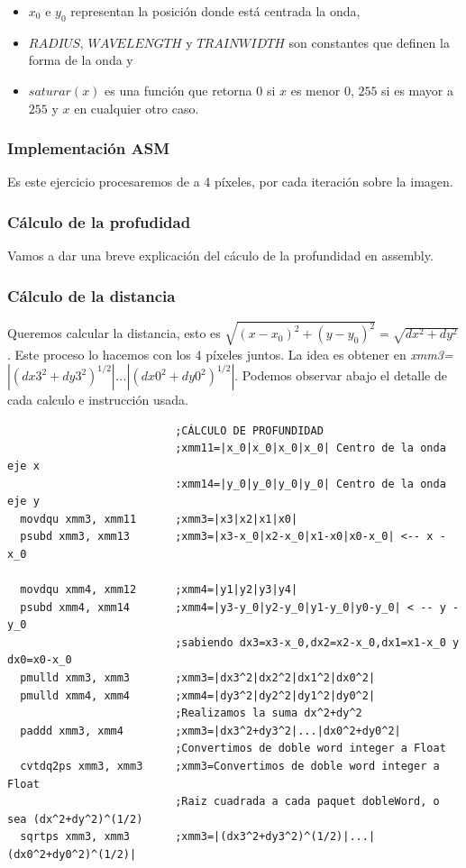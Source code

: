 \begin{itemize}
  \item $x_0$ e $y_0$ representan la posición donde está centrada la onda,
  \item $RADIUS$, $WAVELENGTH$ y $TRAINWIDTH$ son constantes que definen la 
  forma de la onda y
  \item $saturar(x)$ es una función que retorna $0$ si $x$ es menor $0$, $255$
  si es mayor a $255$ y $x$ en cualquier otro caso.
\end{itemize}

\newpage
\subsubsection{Implementación ASM}
Es este ejercicio procesaremos de a 4 píxeles, por cada iteración sobre la imagen.
\subsubsection*{Cálculo de la profudidad}
Vamos a dar una breve explicación del cáculo de la profundidad en assembly.

\subsubsection*{Cálculo de la distancia}

Queremos calcular la distancia, esto es $\sqrt{(x-x_0)^2+(y-y_0)^2} = \sqrt{dx^2+dy^2}$. Este proceso lo hacemos con los 4 píxeles juntos. La idea es obtener en \emph{xmm3=$|(dx3^2+dy3^2)^{1/2}|$...$|(dx0^2+dy0^2)^{1/2}|$}. Podemos observar abajo el detalle de cada calculo e instrucción usada.
\begin{codesnippet}
\begin{verbatim}
                          ;CÁLCULO DE PROFUNDIDAD
                          ;xmm11=|x_0|x_0|x_0|x_0| Centro de la onda eje x
                          :xmm14=|y_0|y_0|y_0|y_0| Centro de la onda eje y
  movdqu xmm3, xmm11      ;xmm3=|x3|x2|x1|x0| 
  psubd xmm3, xmm13       ;xmm3=|x3-x_0|x2-x_0|x1-x0|x0-x_0| <-- x - x_0
            
  movdqu xmm4, xmm12      ;xmm4=|y1|y2|y3|y4|
  psubd xmm4, xmm14       ;xmm4=|y3-y_0|y2-y_0|y1-y_0|y0-y_0| < -- y - y_0	
                          ;sabiendo dx3=x3-x_0,dx2=x2-x_0,dx1=x1-x_0 y dx0=x0-x_0
  pmulld xmm3, xmm3       ;xmm3=|dx3^2|dx2^2|dx1^2|dx0^2|
  pmulld xmm4, xmm4       ;xmm4=|dy3^2|dy2^2|dy1^2|dy0^2|
                          ;Realizamos la suma dx^2+dy^2
  paddd xmm3, xmm4        ;xmm3=|dx3^2+dy3^2|...|dx0^2+dy0^2|
                          ;Convertimos de doble word integer a Float
  cvtdq2ps xmm3, xmm3     ;xmm3=Convertimos de doble word integer a Float
                          ;Raiz cuadrada a cada paquet dobleWord, o sea (dx^2+dy^2)^(1/2)
  sqrtps xmm3, xmm3       ;xmm3=|(dx3^2+dy3^2)^(1/2)|...|(dx0^2+dy0^2)^(1/2)|
\end{verbatim}
\end{codesnippet}

